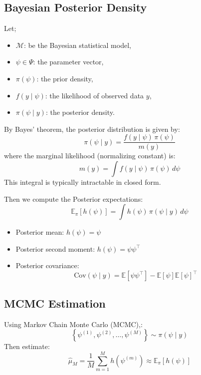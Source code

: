 \subsection*{Bayesian Posterior Density}
Let;
\begin{itemize}
  \item \( \mathcal{M} \): be the Bayesian statistical model,
  \item \( \psi \in \Psi \): the parameter vector,
  \item \( \pi(\psi) \): the prior density,
  \item \( f(y \mid \psi) \): the likelihood of observed data \( y \),
  \item \( \pi(\psi \mid y) \): the posterior density.
\end{itemize}

By Bayes' theorem, the posterior distribution is given by: 
\begin{equation}
\pi(\psi \mid y) = \frac{f(y \mid \psi) \, \pi(\psi)}{m(y)}
\end{equation}
where the marginal likelihood (normalizing constant) is: 
\begin{equation}
m(y) = \int f(y \mid \psi) \, \pi(\psi) \, d\psi
\end{equation}
This integral is typically intractable in closed form.

Then we compute the Posterior expectations:
\begin{equation}
\mathbb{E}_{\pi}[h(\psi)] = \int h(\psi) \, \pi(\psi \mid y) \, d\psi 
\end{equation}
\begin{itemize}
  \item Posterior mean: \( h(\psi) = \psi \)
  \item Posterior second moment: \( h(\psi) = \psi \psi^\top \)
  \item Posterior covariance:
  \begin{equation}
  \mathrm{Cov}(\psi \mid y) = \mathbb{E}[\psi \psi^\top] - \mathbb{E}[\psi]\mathbb{E}[\psi]^\top    
  \end{equation}
\end{itemize}

\subsection*{MCMC Estimation}

Using Markov Chain Monte Carlo (MCMC),:
\begin{equation}
\left\{ \psi^{(1)}, \psi^{(2)}, \dots, \psi^{(M)} \right\} \sim \pi(\psi \mid y)
\end{equation}
Then estimate:
\begin{equation}
\hat{\mu}_M = \frac{1}{M} \sum_{m=1}^M h(\psi^{(m)}) \approx \mathbb{E}_{\pi}[h(\psi)]
\end{equation}

